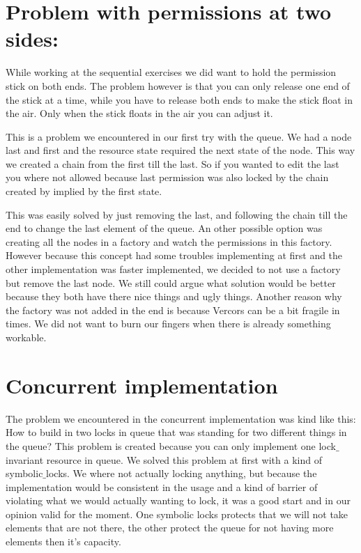 \section{Problem with permissions at two sides:}
While working at the sequential exercises we did want to hold the permission stick on both ends. The problem however is that you can only release one end of the stick at a time, while you have to release both ends to make the stick float in the air. Only when the stick floats in the air you can adjust it. 

This is a problem we encountered in our first try with the queue. We had a node last and first and the resource state required the next state of the node. This way we created a chain from the first till the last. So if you wanted to edit the last you where not allowed because last permission was also locked by the chain created by implied by the first state.

This was easily solved by just removing the last, and following the chain till the end to change the last element of the queue. An other possible option was creating all the nodes in a factory and watch the permissions in this factory. However because this concept had some troubles implementing at first and the other implementation was faster implemented, we decided to not use a factory but remove the last node. We still could argue what solution would be better because they both have there nice things and ugly things. Another reason why the factory was not added in the end is because Vercors can be a bit fragile in times. We did not want to burn our fingers when there is already something workable.

\section{Concurrent implementation}
The problem we encountered in the concurrent implementation was kind like this: How to build in two locks in queue that was standing for two different things in the queue? This problem is created because you can only implement one lock$\_$invariant resource in queue. We solved this problem at first with a kind of symbolic$\_$locks. We where not actually locking anything, but because the implementation would be consistent in the usage and a kind of barrier of violating what we would actually wanting to lock, it was a good start and in our opinion valid for the moment. One symbolic locks protects that we will not take elements that are not there, the other protect the queue for not having more elements then it's capacity.

